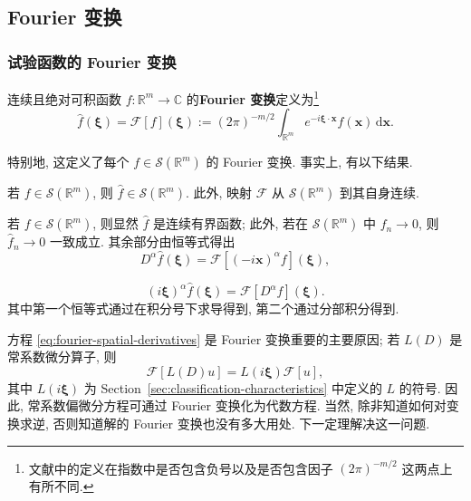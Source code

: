 \subsection{Fourier 变换}\label{sec:fourier-transform}

\subsubsection{试验函数的 Fourier 变换}\label{subsec:fourier-test-functions}

\begin{Definition}
\label{def:fourier-transform}
连续且绝对可积函数 $f:\mathbb{R}^m\to\mathbb{C}$ 的\textbf{Fourier 变换}定义为\footnote{文献中的定义在指数中是否包含负号以及是否包含因子 $(2\pi)^{-m/2}$ 这两点上有所不同.}
\begin{equation}\label{eq:fourier-transform-definition}
\widehat f(\bm{\xi})=\mathcal{F}[f](\bm{\xi}):=(2\pi)^{-m/2}\int_{\mathbb{R}^m}e^{-i\bm{\xi}\cdot\bm{x}}f(\bm{x})\,\mathrm{d}\bm{x}.
\end{equation}

\end{Definition}

特别地, 这定义了每个 $f\in\mathcal{S}(\mathbb{R}^m)$ 的 Fourier 变换. 事实上, 有以下结果.

\begin{Theorem}
\label{thm:fourier-test-space-continuity}
若 $f\in\mathcal{S}(\mathbb{R}^m)$, 则 $\widehat f\in\mathcal{S}(\mathbb{R}^m)$. 此外, 映射 $\mathcal{F}$ 从 $\mathcal{S}(\mathbb{R}^m)$ 到其自身连续.
\end{Theorem}

\begin{Proof}
若 $f\in\mathcal{S}(\mathbb{R}^m)$, 则显然 $\widehat f$ 是连续有界函数; 此外, 若在 $\mathcal{S}(\mathbb{R}^m)$ 中 $f_n\to0$, 则 $\widehat f_n\to0$ 一致成立. 其余部分由恒等式得出
\begin{equation}\label{eq:fourier-frequency-derivatives}
D^\alpha\widehat f(\bm{\xi})=\mathcal{F}[(-i\bm{x})^\alpha f](\bm{\xi}),
\end{equation}

\begin{equation}\label{eq:fourier-spatial-derivatives}
(i\bm{\xi})^\alpha\widehat f(\bm{\xi})=\mathcal{F}[D^\alpha f](\bm{\xi}).
\end{equation}
其中第一个恒等式通过在积分号下求导得到, 第二个通过分部积分得到.
\end{Proof}

方程 \eqref{eq:fourier-spatial-derivatives} 是 Fourier 变换重要的主要原因; 若 $L(D)$ 是常系数微分算子, 则
\begin{equation}\label{eq:fourier-constant-coefficient-operator-symbol}
\mathcal{F}[L(D)u]=L(i\bm{\xi})\mathcal{F}[u],
\end{equation}
其中 $L(i\bm{\xi})$ 为 Section~\ref{sec:classification-characteristics} 中定义的 $L$ 的符号. 因此, 常系数偏微分方程可通过 Fourier 变换化为代数方程. 当然, 除非知道如何对变换求逆, 否则知道解的 Fourier 变换也没有多大用处. 下一定理解决这一问题.

